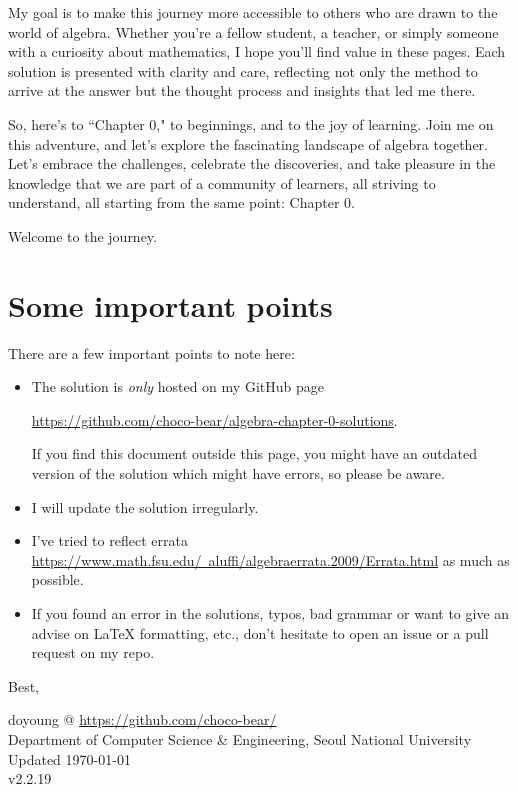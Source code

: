 My goal is to make this journey more accessible to others who are drawn to the world of algebra. Whether you're a fellow student, a teacher, or simply someone with a curiosity about mathematics, I hope you'll find value in these pages. Each solution is presented with clarity and care, reflecting not only the method to arrive at the answer but the thought process and insights that led me there.

So, here's to ``Chapter 0," to beginnings, and to the joy of learning. Join me on this adventure, and let's explore the fascinating landscape of algebra together. Let's embrace the challenges, celebrate the discoveries, and take pleasure in the knowledge that we are part of a community of learners, all striving to understand, all starting from the same point: Chapter 0.

Welcome to the journey.

\newpage
\section*{Some important points}
There are a few important points to note here:
\begin{itemize}
    \item The solution is \emph{only} hosted on my GitHub page
        \begin{center}
		  \href{https://github.com/choco-bear/algebra-chapter-0-solutions}{https://github.com/choco-bear/algebra-chapter-0-solutions}.
        \end{center} 
        If you find this document outside this page, you might have an outdated version of the solution which might have errors, so please be aware.
    \item I will update the solution irregularly.
    \item I've tried to reflect errata \href{https://www.math.fsu.edu/~aluffi/algebraerrata.2009/Errata.html}{https://www.math.fsu.edu/~aluffi/algebraerrata.2009/Errata.html} as much as possible.
    \item If you found an error in the solutions, typos, bad grammar or want to give an advise on LaTeX formatting, etc., don't hesitate to open an issue or a pull request on my repo. 
\end{itemize}

Best,

\begin{flushright}
doyoung @ \href{https://github.com/choco-bear/}{https://github.com/choco-bear/} \\
Department of Computer Science \& Engineering, Seoul National University \\
Updated \specialdate\today \\
v2.2.19
\end{flushright}